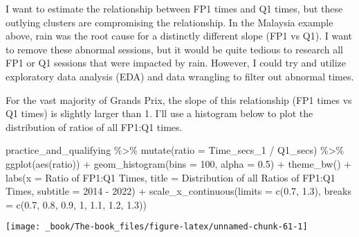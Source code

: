 \documentclass[
]{book}
\newenvironment{Shaded}{\begin{snugshade}}{\end{snugshade}}
\newcommand{\AttributeTok}[1]{\textcolor[rgb]{0.77,0.63,0.00}{#1}}
\newcommand{\DecValTok}[1]{\textcolor[rgb]{0.00,0.00,0.81}{#1}}
\newcommand{\FloatTok}[1]{\textcolor[rgb]{0.00,0.00,0.81}{#1}}
\newcommand{\FunctionTok}[1]{\textcolor[rgb]{0.00,0.00,0.00}{#1}}
\newcommand{\NormalTok}[1]{#1}
\newcommand{\SpecialCharTok}[1]{\textcolor[rgb]{0.00,0.00,0.00}{#1}}
\newcommand{\StringTok}[1]{\textcolor[rgb]{0.31,0.60,0.02}{#1}}
\begin{document}
I want to estimate the relationship between FP1 times and Q1 times, but these outlying clusters are compromising the relationship. In the Malaysia example above, rain was the root cause for a distinctly different slope (FP1 vs Q1). I want to remove these abnormal sessions, but it would be quite tedious to research all FP1 or Q1 sessions that were impacted by rain. However, I could try and utilize exploratory data analysis (EDA) and data wrangling to filter out abnormal times.

For the vast majority of Grands Prix, the slope of this relationship (FP1 times vs Q1 times) is slightly larger than 1. I'll use a histogram below to plot the distribution of ratios of all FP1:Q1 times.

\begin{Shaded}
\begin{Highlighting}[]
\NormalTok{practice\_and\_qualifying }\SpecialCharTok{\%\textgreater{}\%}
  \FunctionTok{mutate}\NormalTok{(}\AttributeTok{ratio =}\NormalTok{ Time\_secs\_1 }\SpecialCharTok{/}\NormalTok{ Q1\_secs) }\SpecialCharTok{\%\textgreater{}\%} 
  \FunctionTok{ggplot}\NormalTok{(}\FunctionTok{aes}\NormalTok{(ratio)) }\SpecialCharTok{+} 
  \FunctionTok{geom\_histogram}\NormalTok{(}\AttributeTok{bins =} \DecValTok{100}\NormalTok{, }\AttributeTok{alpha =} \FloatTok{0.5}\NormalTok{) }\SpecialCharTok{+} 
  \FunctionTok{theme\_bw}\NormalTok{() }\SpecialCharTok{+}
  \FunctionTok{labs}\NormalTok{(}\AttributeTok{x =} \StringTok{\textquotesingle{}Ratio of FP1:Q1 Times\textquotesingle{}}\NormalTok{,}
       \AttributeTok{title =} \StringTok{\textquotesingle{}Distribution of all Ratios of FP1:Q1 Times\textquotesingle{}}\NormalTok{,}
       \AttributeTok{subtitle =} \StringTok{\textquotesingle{}2014 {-} 2022\textquotesingle{}}\NormalTok{) }\SpecialCharTok{+}
  \FunctionTok{scale\_x\_continuous}\NormalTok{(}\AttributeTok{limits =} \FunctionTok{c}\NormalTok{(}\FloatTok{0.7}\NormalTok{, }\FloatTok{1.3}\NormalTok{), }
                     \AttributeTok{breaks =} \FunctionTok{c}\NormalTok{(}\FloatTok{0.7}\NormalTok{, }\FloatTok{0.8}\NormalTok{, }\FloatTok{0.9}\NormalTok{, }\DecValTok{1}\NormalTok{, }\FloatTok{1.1}\NormalTok{, }\FloatTok{1.2}\NormalTok{, }\FloatTok{1.3}\NormalTok{))}
\end{Highlighting}
\end{Shaded}

\begin{center}\texttt{[image: \_book/The-book\_files/figure-latex/unnamed-chunk-61-1]} \end{center}
\end{document}
